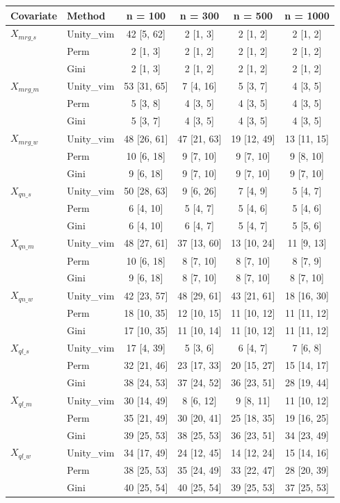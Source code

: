 
\begin{tabular}{llcccc}
\toprule
Covariate & Method & n = 100 & n = 300 & n = 500 & n = 1000\\
\midrule
$X_{mrg\_s}$ & Unity\_vim & 42 [5, 62] & 2 [1, 3] & 2 [1, 2] & 2 [1, 2]\\
 & Perm & 2 [1, 3] & 2 [1, 2] & 2 [1, 2] & 2 [1, 2]\\
 & Gini & 2 [1, 3] & 2 [1, 2] & 2 [1, 2] & 2 [1, 2]\\
$X_{mrg\_m}$ & Unity\_vim & 53 [31, 65] & 7 [4, 16] & 5 [3, 7] & 4 [3, 5]\\
 & Perm & 5 [3, 8] & 4 [3, 5] & 4 [3, 5] & 4 [3, 5]\\
 & Gini & 5 [3, 7] & 4 [3, 5] & 4 [3, 5] & 4 [3, 5]\\
$X_{mrg\_w}$ & Unity\_vim & 48 [26, 61] & 47 [21, 63] & 19 [12, 49] & 13 [11, 15]\\
 & Perm & 10 [6, 18] & 9 [7, 10] & 9 [7, 10] & 9 [8, 10]\\
 & Gini & 9 [6, 18] & 9 [7, 10] & 9 [7, 10] & 9 [7, 10]\\
$X_{qn\_s}$ & Unity\_vim & 50 [28, 63] & 9 [6, 26] & 7 [4, 9] & 5 [4, 7]\\
 & Perm & 6 [4, 10] & 5 [4, 7] & 5 [4, 6] & 5 [4, 6]\\
 & Gini & 6 [4, 10] & 6 [4, 7] & 5 [4, 7] & 5 [5, 6]\\
$X_{qn\_m}$ & Unity\_vim & 48 [27, 61] & 37 [13, 60] & 13 [10, 24] & 11 [9, 13]\\
 & Perm & 10 [6, 18] & 8 [7, 10] & 8 [7, 10] & 8 [7, 9]\\
 & Gini & 9 [6, 18] & 8 [7, 10] & 8 [7, 10] & 8 [7, 10]\\
$X_{qn\_w}$ & Unity\_vim & 42 [23, 57] & 48 [29, 61] & 43 [21, 61] & 18 [16, 30]\\
 & Perm & 18 [10, 35] & 12 [10, 15] & 11 [10, 12] & 11 [11, 12]\\
 & Gini & 17 [10, 35] & 11 [10, 14] & 11 [10, 12] & 11 [11, 12]\\
$X_{ql\_s}$ & Unity\_vim & 17 [4, 39] & 5 [3, 6] & 6 [4, 7] & 7 [6, 8]\\
 & Perm & 32 [21, 46] & 23 [17, 33] & 20 [15, 27] & 15 [14, 17]\\
 & Gini & 38 [24, 53] & 37 [24, 52] & 36 [23, 51] & 28 [19, 44]\\
$X_{ql\_m}$ & Unity\_vim & 30 [14, 49] & 8 [6, 12] & 9 [8, 11] & 11 [10, 12]\\
 & Perm & 35 [21, 49] & 30 [20, 41] & 25 [18, 35] & 19 [16, 25]\\
 & Gini & 39 [25, 53] & 38 [25, 53] & 36 [23, 51] & 34 [23, 49]\\
$X_{ql\_w}$ & Unity\_vim & 34 [17, 49] & 24 [12, 45] & 14 [12, 24] & 15 [14, 16]\\
 & Perm & 38 [25, 53] & 35 [24, 49] & 33 [22, 47] & 28 [20, 39]\\
 & Gini & 40 [25, 54] & 40 [25, 54] & 39 [25, 53] & 37 [25, 53]\\
\bottomrule
\end{tabular}
